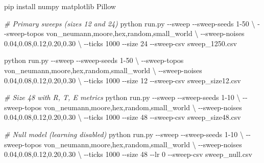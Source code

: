 \documentclass[
  11pt,
]{article}
\newenvironment{Shaded}{}{}
\newcommand{\AttributeTok}[1]{\textcolor[rgb]{0.49,0.56,0.16}{#1}}
\newcommand{\CommentTok}[1]{\textcolor[rgb]{0.38,0.63,0.69}{\textit{#1}}}
\newcommand{\DataTypeTok}[1]{\textcolor[rgb]{0.56,0.13,0.00}{#1}}
\newcommand{\ExtensionTok}[1]{#1}
\newcommand{\NormalTok}[1]{#1}
\begin{document}
\begin{Shaded}
\begin{Highlighting}[]
\ExtensionTok{pip}\NormalTok{ install numpy matplotlib Pillow}

\CommentTok{\# Primary sweeps (sizes 12 and 24)}
\ExtensionTok{python}\NormalTok{ run.py }\AttributeTok{{-}{-}sweep} \AttributeTok{{-}{-}sweep{-}seeds}\NormalTok{ 1{-}50 }\DataTypeTok{\textbackslash{}}
  \AttributeTok{{-}{-}sweep{-}topos}\NormalTok{ von\_neumann,moore,hex,random,small\_world }\DataTypeTok{\textbackslash{}}
  \AttributeTok{{-}{-}sweep{-}noises}\NormalTok{ 0.04,0.08,0.12,0.20,0.30 }\DataTypeTok{\textbackslash{}}
  \AttributeTok{{-}{-}ticks}\NormalTok{ 1000 }\AttributeTok{{-}{-}size}\NormalTok{ 24 }\AttributeTok{{-}{-}sweep{-}csv}\NormalTok{ sweep\_1250.csv}

\ExtensionTok{python}\NormalTok{ run.py }\AttributeTok{{-}{-}sweep} \AttributeTok{{-}{-}sweep{-}seeds}\NormalTok{ 1{-}50 }\DataTypeTok{\textbackslash{}}
  \AttributeTok{{-}{-}sweep{-}topos}\NormalTok{ von\_neumann,moore,hex,random,small\_world }\DataTypeTok{\textbackslash{}}
  \AttributeTok{{-}{-}sweep{-}noises}\NormalTok{ 0.04,0.08,0.12,0.20,0.30 }\DataTypeTok{\textbackslash{}}
  \AttributeTok{{-}{-}ticks}\NormalTok{ 1000 }\AttributeTok{{-}{-}size}\NormalTok{ 12 }\AttributeTok{{-}{-}sweep{-}csv}\NormalTok{ sweep\_size12.csv}

\CommentTok{\# Size 48 with R, T, E metrics}
\ExtensionTok{python}\NormalTok{ run.py }\AttributeTok{{-}{-}sweep} \AttributeTok{{-}{-}sweep{-}seeds}\NormalTok{ 1{-}10 }\DataTypeTok{\textbackslash{}}
  \AttributeTok{{-}{-}sweep{-}topos}\NormalTok{ von\_neumann,moore,hex,random,small\_world }\DataTypeTok{\textbackslash{}}
  \AttributeTok{{-}{-}sweep{-}noises}\NormalTok{ 0.04,0.08,0.12,0.20,0.30 }\DataTypeTok{\textbackslash{}}
  \AttributeTok{{-}{-}ticks}\NormalTok{ 1000 }\AttributeTok{{-}{-}size}\NormalTok{ 48 }\AttributeTok{{-}{-}sweep{-}csv}\NormalTok{ sweep\_size48.csv}

\CommentTok{\# Null model (learning disabled)}
\ExtensionTok{python}\NormalTok{ run.py }\AttributeTok{{-}{-}sweep} \AttributeTok{{-}{-}sweep{-}seeds}\NormalTok{ 1{-}10 }\DataTypeTok{\textbackslash{}}
  \AttributeTok{{-}{-}sweep{-}topos}\NormalTok{ von\_neumann,moore,hex,random,small\_world }\DataTypeTok{\textbackslash{}}
  \AttributeTok{{-}{-}sweep{-}noises}\NormalTok{ 0.04,0.08,0.12,0.20,0.30 }\DataTypeTok{\textbackslash{}}
  \AttributeTok{{-}{-}ticks}\NormalTok{ 1000 }\AttributeTok{{-}{-}size}\NormalTok{ 48 }\AttributeTok{{-}{-}lr}\NormalTok{ 0 }\AttributeTok{{-}{-}sweep{-}csv}\NormalTok{ sweep\_null.csv}


\end{Highlighting}
\end{Shaded}
\end{document}

